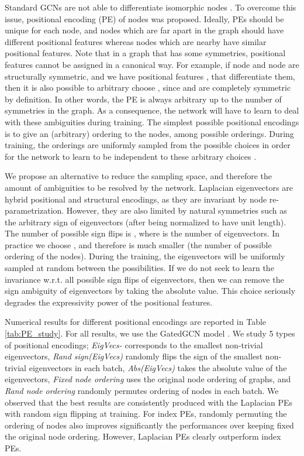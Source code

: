 \documentclass{article}
\begin{document}
Standard GCNs are not able to differentiate isomorphic nodes \cite{murphy2019relational,you2019position}. To overcome this issue, positional encoding (PE) of nodes was proposed. Ideally, PEs should be unique for each node, and nodes which are far apart in the graph should have different positional features whereas nodes which are nearby have similar positional features. Note that in a graph that has some symmetries, positional features cannot be assigned in a canonical way. For example, if node  and node  are structurally symmetric, and we have positional features  ,   that differentiate them, then it is also possible to arbitrary choose ,   since  and  are completely symmetric by definition. In other words, the PE is always arbitrary up to the number of symmetries in the graph. As a consequence, the network will have to learn to deal with these ambiguities during training. The simplest possible positional encodings is to give an (arbitrary) ordering to the nodes, among  possible orderings. During training, the orderings are uniformly sampled from the  possible choices in order for the network to learn to be independent to these arbitrary choices \cite{murphy2019relational}. 


We propose an alternative to reduce the sampling space, and therefore the amount of ambiguities to be resolved by the network. Laplacian eigenvectors are hybrid positional and structural encodings, as they are invariant by node re-parametrization. However, they are also limited by natural symmetries such as the arbitrary sign of eigenvectors (after being normalized to have unit length). The number of possible sign flips is , where  is the number of eigenvectors. In practice we choose , and therefore  is much smaller  (the number of possible ordering of the nodes). During the training, the eigenvectors will be uniformly sampled at random between the  possibilities. If we do not seek to learn the invariance w.r.t. all possible sign flips of eigenvectors, then we can remove the sign ambiguity of eigenvectors by taking the absolute value. This choice seriously degrades the expressivity power of the positional features. 


Numerical results for different positional encodings are reported in Table \ref{tab:PE_study}. For all results, we use the GatedGCN model \cite{bresson2017residual}. We study 5 types of positional encodings; {\it EigVecs-} corresponds to the smallest non-trivial  eigenvectors, {\it Rand sign(EigVecs)} randomly flips the sign of the  smallest non-trivial eigenvectors in each batch, {\it Abs(EigVecs)} takes the absolute value of the  eigenvectors, {\it Fixed node ordering} uses the original node ordering of  graphs, and {\it Rand node ordering} randomly permutes ordering of nodes in each batch. We observed that the best results are consistently produced with the Laplacian PEs with random sign flipping at training. For index PEs, randomly permuting the ordering of nodes also improves significantly the performances over keeping fixed the original node ordering. However, Laplacian PEs clearly outperform index PEs. 
\end{document}
